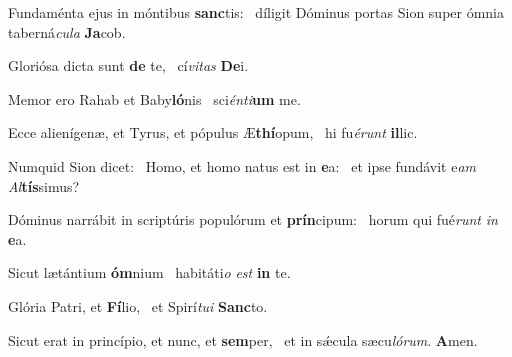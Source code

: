 \item Fundaménta ejus in móntibus \textbf{sanc}tis:~\psstar{} díligit Dóminus portas Sion super ómnia taberná\textit{cula} \textbf{Ja}cob.
\item Gloriósa dicta sunt \textbf{de} te,~\psstar{} cí\textit{vitas} \textbf{De}i.
\item Memor ero Rahab et Baby\textbf{ló}nis~\psstar{} sci\textit{énti}\textbf{um} me.
\item Ecce alienígenæ, et Tyrus, et pópulus Æ\textbf{thí}opum,~\psstar{} hi fu\textit{érunt} \textbf{il}lic.
\item Numquid Sion dicet:~\pscross{} Homo, et homo natus est in \textbf{e}a:~\psstar{} et ipse fundávit e\textit{am} \textit{Al}\textbf{tís}simus?
\item Dóminus narrábit in scriptúris populórum et \textbf{prín}cipum:~\psstar{} horum qui fué\textit{runt} \textit{in} \textbf{e}a.
\item Sicut lætántium \textbf{óm}nium~\psstar{} habitáti\textit{o} \textit{est} \textbf{in} te.
\item Glória Patri, et \textbf{Fí}lio,~\psstar{} et Spirí\textit{tui} \textbf{Sanc}to.
\item Sicut erat in princípio, et nunc, et \textbf{sem}per,~\psstar{} et in sǽcula sæcu\textit{lórum}. \textbf{A}men.
